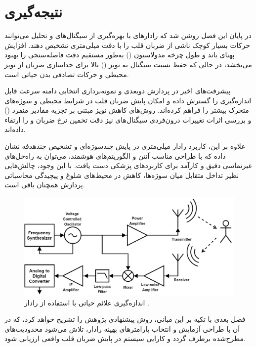 \section{نتیجه‌گیری}
در پایان این فصل روشن شد که رادارهای  با بهره‌گیری از سیگنال‌های  و تحلیل  می‌توانند حرکات بسیار کوچک ناشی از ضربان قلب را با دقت میلی‌متری تشخیص دهند. افزایش پهنای باند و طول چرخه مدولاسیون () به‌طور مستقیم دقت فاصله‌سنجی را بهبود می‌بخشد، در حالی که حفظ نسبت سیگنال به نویز () بالا برای جداسازی ضربان از نویز محیطی و حرکات تصادفی بدن حیاتی است.

پیشرفت‌های اخیر در پردازش دوبعدی  \cite{neemat2019reconfigurable} و نمونه‌برداری انتخابی \cite{kwak2024adjusting} دامنه سرعت قابل اندازه‌گیری را گسترش داده و امکان پایش ضربان قلب در شرایط محیطی و سوژه‌های متحرک بیشتر را فراهم کرده‌اند. روش‌های کاهش نویز مبتنی بر تجزیه مقادیر منفرد () \cite{lv2024millimeter} و بررسی اثرات تغییرات درون‌فردی سیگنال‌های  \cite{demirsoy2024investigating} نیز دقت تخمین نرخ ضربان و  را ارتقاء داده‌اند.

علاوه بر این، کاربرد رادار میلی‌متری در پایش چندسوژه‌ای \cite{islam2020non} و تشخیص چندهدفه  \cite{xu2024health} نشان داده که با طراحی مناسب آنتن و الگوریتم‌های هوشمند، می‌توان به راه‌حل‌های غیرتماسی دقیق و کارآمد برای کاربردهای پزشکی دست یافت. با این وجود، چالش‌هایی نظیر تداخل متقابل میان سوژه‌ها، کاهش  در محیط‌های شلوغ و پیچیدگی محاسباتی پردازش  همچنان باقی است.

\begin{figure}[ht]
    \centering
    \includegraphics[width=0.7\linewidth]{Images/chapter2/2-3.png}
    \caption{اندازه‌گیری علائم حیاتی با استفاده از رادار  \cite{digikey_fmcw}.}
    \label{fig:fmcw_vitals}
\end{figure}

\vspace{5cm}

فصل بعدی با تکیه بر این مبانی، روش پیشنهادی پژوهش را تشریح خواهد کرد، که در آن با طراحی آزمایش و انتخاب پارامترهای بهینه رادار، تلاش می‌شود محدودیت‌های مطرح‌شده برطرف گردد و کارایی سیستم در پایش ضربان قلب واقعی ارزیابی شود.


